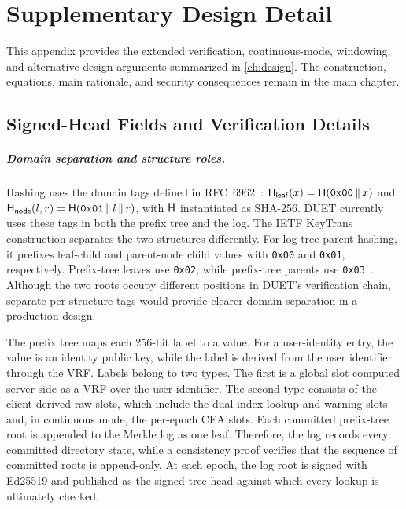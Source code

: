\chapter{Supplementary Design Detail}\label{app:design-detail}

This appendix provides the extended verification, continuous-mode, windowing, and alternative-design
arguments summarized in \cref{ch:design}. The construction, equations, main rationale, and
security consequences remain in the main chapter.

\section{Signed-Head Fields and Verification Details}\label{sec:design-detail-sth}

\paragraph{Domain separation and structure roles.} Hashing uses the domain tags defined in
RFC~6962~\cite[Section~2.1]{rfc6962}:
$\mathsf{H}_{\mathsf{leaf}}(x)=\mathsf{H}(\mathtt{0x00}\,\|\, x)$ and
$\mathsf{H}_{\mathsf{node}}(l,r)=\mathsf{H}(\mathtt{0x01}\,\|\, l\,\|\, r)$, with $\mathsf{H}$
instantiated as SHA-256. DUET currently uses these tags in both the prefix tree and the log. The IETF KeyTrans construction
separates the two structures differently. For log-tree parent hashing, it prefixes leaf-child and
parent-node child values with \texttt{0x00} and \texttt{0x01}, respectively. Prefix-tree leaves use
\texttt{0x02}, while prefix-tree parents use
\texttt{0x03}~\cite[Sections~11.8--11.9]{ietf-keytrans-protocol}. Although the two roots occupy
different positions in DUET's verification chain, separate per-structure tags would provide clearer
domain separation in a production design.

The prefix tree maps each 256-bit label to a value. For a user-identity entry, the value is an
identity public key, while the label is derived from the user identifier through the VRF. Labels
belong to two types. The first is a global slot computed server-side as a VRF over the user
identifier. The second type consists of the client-derived raw slots, which include the dual-index lookup
and warning slots and, in continuous mode, the per-epoch CEA slots. Each committed prefix-tree root
is appended to the Merkle log as one leaf. Therefore, the log records every committed directory
state, while a consistency proof verifies that the sequence of committed roots is append-only. At
each epoch, the log root is signed with Ed25519 and published as the signed tree head against which
every lookup is ultimately checked.

